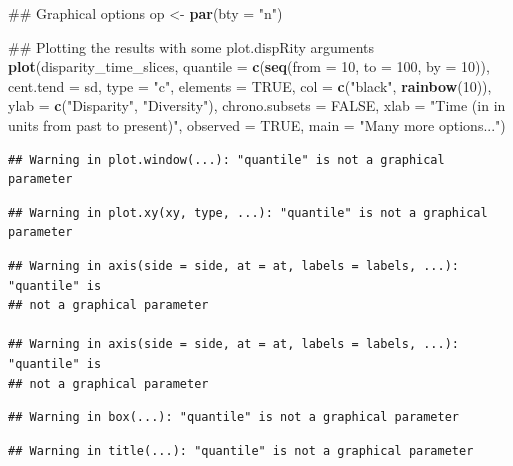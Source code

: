 \documentclass[]{book}
\newenvironment{Shaded}{\begin{snugshade}}{\end{snugshade}}
\newcommand{\KeywordTok}[1]{\textcolor[rgb]{0.13,0.29,0.53}{\textbf{#1}}}
\newcommand{\DataTypeTok}[1]{\textcolor[rgb]{0.13,0.29,0.53}{#1}}
\newcommand{\DecValTok}[1]{\textcolor[rgb]{0.00,0.00,0.81}{#1}}
\newcommand{\StringTok}[1]{\textcolor[rgb]{0.31,0.60,0.02}{#1}}
\newcommand{\OtherTok}[1]{\textcolor[rgb]{0.56,0.35,0.01}{#1}}
\newcommand{\NormalTok}[1]{#1}
\theoremstyle{definition}
\theoremstyle{definition}
\theoremstyle{remark}
\begin{document}
\begin{Shaded}
\begin{Highlighting}[]
\NormalTok{## Graphical options}
\NormalTok{op <-}\StringTok{ }\KeywordTok{par}\NormalTok{(}\DataTypeTok{bty =} \StringTok{"n"}\NormalTok{)}

\NormalTok{## Plotting the results with some plot.dispRity arguments}
\KeywordTok{plot}\NormalTok{(disparity_time_slices, }\DataTypeTok{quantile =} \KeywordTok{c}\NormalTok{(}\KeywordTok{seq}\NormalTok{(}\DataTypeTok{from =} \DecValTok{10}\NormalTok{, }\DataTypeTok{to =} \DecValTok{100}\NormalTok{, }\DataTypeTok{by =} \DecValTok{10}\NormalTok{)),}
    \DataTypeTok{cent.tend =}\NormalTok{ sd, }\DataTypeTok{type =} \StringTok{"c"}\NormalTok{, }\DataTypeTok{elements =} \OtherTok{TRUE}\NormalTok{, }\DataTypeTok{col =} \KeywordTok{c}\NormalTok{(}\StringTok{"black"}\NormalTok{, }\KeywordTok{rainbow}\NormalTok{(}\DecValTok{10}\NormalTok{)),}
    \DataTypeTok{ylab =} \KeywordTok{c}\NormalTok{(}\StringTok{"Disparity"}\NormalTok{, }\StringTok{"Diversity"}\NormalTok{), }\DataTypeTok{chrono.subsets =} \OtherTok{FALSE}\NormalTok{,}
    \DataTypeTok{xlab =} \StringTok{"Time (in in units from past to present)"}\NormalTok{, }\DataTypeTok{observed =} \OtherTok{TRUE}\NormalTok{,}
    \DataTypeTok{main =} \StringTok{"Many more options..."}\NormalTok{)}
\end{Highlighting}
\end{Shaded}

\begin{verbatim}
## Warning in plot.window(...): "quantile" is not a graphical parameter
\end{verbatim}

\begin{verbatim}
## Warning in plot.xy(xy, type, ...): "quantile" is not a graphical parameter
\end{verbatim}

\begin{verbatim}
## Warning in axis(side = side, at = at, labels = labels, ...): "quantile" is
## not a graphical parameter

## Warning in axis(side = side, at = at, labels = labels, ...): "quantile" is
## not a graphical parameter
\end{verbatim}

\begin{verbatim}
## Warning in box(...): "quantile" is not a graphical parameter
\end{verbatim}

\begin{verbatim}
## Warning in title(...): "quantile" is not a graphical parameter
\end{verbatim}
\end{document}

